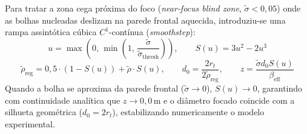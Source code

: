 Para tratar a zona cega próxima do foco (\emph{near-focus blind zone}, $\widetilde{\sigma} < 0{,}05$) onde as bolhas nucleadas deslizam na parede frontal aquecida, introduziu-se uma rampa assintótica cúbica $C^1$-contínua (\emph{smoothstep}):
\begin{equation}
    u = \max\left(0, \, \min\left(1, \, \frac{\widetilde{\sigma}}{\widetilde{\sigma}_{\text{thresh}}}\right)\right), \qquad S(u) = 3u^2 - 2u^3
\end{equation}
\begin{equation}
    \widetilde{\rho}_{\text{reg}} = 0{,}5 \cdot (1 - S(u)) + \widetilde{\rho} \cdot S(u), \qquad d_0 = \frac{2 r_t}{2 \widetilde{\rho}_{\text{reg}}}, \qquad z = \frac{\widetilde{\sigma} d_0 S(u)}{\beta_{\text{eff}}}
\end{equation}
Quando a bolha se aproxima da parede frontal ($\widetilde{\sigma} \to 0$), $S(u) \to 0$, garantindo com continuidade analítica que $z \to 0{,}0\,\mathrm{m}$ e o diâmetro focado coincide com a silhueta geométrica ($d_0 = 2r_t$), estabilizando numericamente o modelo experimental.
